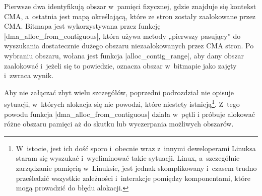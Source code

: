 Pierwsze dwa identyfikują obszar w~pamięci fizycznej, gdzie znajduje
się kontekst CMA, a~ostatnia jest mapą określającą, które ze stron
zostały zaalokowane przez CMA.  Bitmapa jest wykorzystywana przez
funkcję \code|dma_alloc_from_contiguous|, która używa metody „pierwszy
pasujący” do wyszukania dostatecznie dużego obszaru niezaalokowanych
przez CMA stron.  Po wybraniu obszaru, wołana jest funkcja
\code|alloc_contig_range|, aby dany obszar zaalokować i~jeżeli się to
powiedzie, oznacza obszar w~bitmapie jako zajęty i~zwraca wynik.

Aby nie załączać zbyt wielu szczegółów, poprzedni podrozdział nie
opisuje sytuacji, w~których alokacja się nie powodzi, które niestety
istnieją\footnote{W~istocie, jest ich dość sporo i~obecnie wraz
  z~innymi deweloperami Linuksa staram się wyszukać i~wyeliminować
  takie sytuacji.  Linux, a~szczególnie zarządzanie pamięcią
  w~Linuksie, jest jednak skomplikowany i~czasem trudno prześledzić
  wszystkie zależności i~interakcje pomiędzy komponentami, które mogą
  prowadzić do błędu alokacji.}.  Z~tego powodu funkcja
\code|dma_alloc_from_contiguous| działa w~pętli i próbuje alokować
różne obszaru pamięci aż do skutku lub wyczerpania możliwych obszarów.
